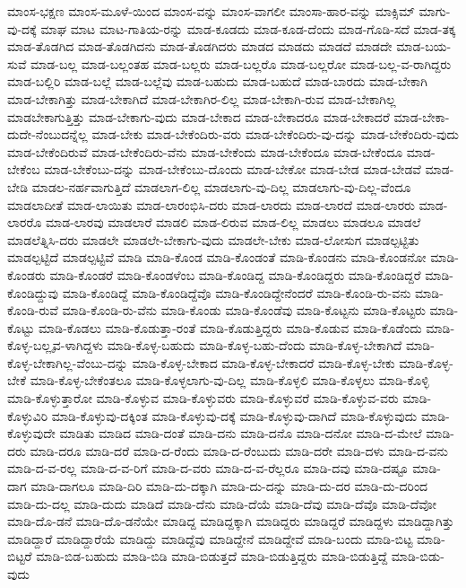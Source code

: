 {ಮಾಂಸ-ಭಕ್ಷಣ
ಮಾಂಸ-ಮೂಳೆ-ಯಿಂದ
ಮಾಂಸ-ವನ್ನು
ಮಾಂಸ-ವಾಗಲೀ
ಮಾಂಸಾ-ಹಾರ-ವನ್ನು
ಮಾಕ್ಸಿಮ್
ಮಾಗು-ವು-ದಕ್ಕೆ
ಮಾಘ
ಮಾಟ
ಮಾಟ-ಗಾತಿಯ-ರನ್ನು
ಮಾಡ-ಕೂಡದು
ಮಾಡ-ಕೂಡ-ದೆಂದು
ಮಾಡ-ಗೊಡಿ-ಸದೆ
ಮಾಡ-ತಕ್ಕ
ಮಾಡ-ತೊಡಗಿದ
ಮಾಡ-ತೊಡಗಿದನು
ಮಾಡ-ತೊಡಗಿದರು
ಮಾಡದ
ಮಾಡದು
ಮಾಡದೆ
ಮಾಡದೇ
ಮಾಡ-ಬಯ-ಸುವೆ
ಮಾಡ-ಬಲ್ಲ
ಮಾಡ-ಬಲ್ಲಂತಹ
ಮಾಡ-ಬಲ್ಲರು
ಮಾಡ-ಬಲ್ಲರೊ
ಮಾಡ-ಬಲ್ಲರೋ
ಮಾಡ-ಬಲ್ಲ-ವ-ರಾಗಿದ್ದರು
ಮಾಡ-ಬಲ್ಲಿರಿ
ಮಾಡ-ಬಲ್ಲೆ
ಮಾಡ-ಬಲ್ಲೆವು
ಮಾಡ-ಬಹುದು
ಮಾಡ-ಬಹುದೆ
ಮಾಡ-ಬಾರದು
ಮಾಡ-ಬೇಕಾಗಿ
ಮಾಡ-ಬೇಕಾಗಿತ್ತು
ಮಾಡ-ಬೇಕಾಗಿದೆ
ಮಾಡ-ಬೇಕಾಗಿರ-ಲಿಲ್ಲ
ಮಾಡ-ಬೇಕಾಗಿ-ರುವ
ಮಾಡ-ಬೇಕಾಗಿಲ್ಲ
ಮಾಡಬೇಕಾಗುತ್ತಿತ್ತು
ಮಾಡ-ಬೇಕಾಗು-ವುದು
ಮಾಡ-ಬೇಕಾದ
ಮಾಡ-ಬೇಕಾದರೂ
ಮಾಡ-ಬೇಕಾದರೆ
ಮಾಡ-ಬೇಕಾ-ದುದೇ-ನೆಂಬುದನ್ನೆಲ್ಲ
ಮಾಡ-ಬೇಕು
ಮಾಡ-ಬೇಕೆಂದಿರು-ವರು
ಮಾಡ-ಬೇಕೆಂದಿರು-ವು-ದನ್ನು
ಮಾಡ-ಬೇಕೆಂದಿರು-ವುದು
ಮಾಡ-ಬೇಕೆಂದಿರುವೆ
ಮಾಡ-ಬೇಕೆಂದಿರು-ವೆನು
ಮಾಡ-ಬೇಕೆಂದು
ಮಾಡ-ಬೇಕೆಂದೂ
ಮಾಡ-ಬೇಕೆಂದೂ
ಮಾಡ-ಬೇಕೆಂಬ
ಮಾಡ-ಬೇಕೆಂಬು-ದನ್ನು
ಮಾಡ-ಬೇಕೆಂಬು-ದೊಂದು
ಮಾಡ-ಬೇಕೋ
ಮಾಡ-ಬೇಡ
ಮಾಡ-ಬೇಡವೆ
ಮಾಡ-ಬೇಡಿ
ಮಾಡಲ-ನರ್ಹವಾಗುತ್ತಿದೆ
ಮಾಡಲಾಗ-ಲಿಲ್ಲ
ಮಾಡಲಾಗು-ವು-ದಿಲ್ಲ
ಮಾಡಲಾಗು-ವು-ದಿಲ್ಲ-ವೆಂದೂ
ಮಾಡಲಾದೀತೆ
ಮಾಡ-ಲಾಯಿತು
ಮಾಡ-ಲಾರಂಭಿಸಿ-ದರು
ಮಾಡ-ಲಾರದು
ಮಾಡ-ಲಾರದೆ
ಮಾಡ-ಲಾರರು
ಮಾಡ-ಲಾರರೊ
ಮಾಡ-ಲಾರವು
ಮಾಡಲಾರೆ
ಮಾಡಲಿ
ಮಾಡ-ಲಿರುವ
ಮಾಡ-ಲಿಲ್ಲ
ಮಾಡಲು
ಮಾಡಲೂ
ಮಾಡಲೆ
ಮಾಡಲೆತ್ನಿಸಿ-ದರು
ಮಾಡಲೇ
ಮಾಡಲೇ-ಬೇಕಾಗು-ವುದು
ಮಾಡಲೇ-ಬೇಕು
ಮಾಡ-ಲೋಸುಗ
ಮಾಡಲ್ಪಟ್ಟಿತು
ಮಾಡಲ್ಪಟ್ಟಿದೆ
ಮಾಡಲ್ಪಟ್ಟಿವೆ
ಮಾಡಿ
ಮಾಡಿ-ಕೊಂಡ
ಮಾಡಿ-ಕೊಂಡಂತೆ
ಮಾಡಿ-ಕೊಂಡನು
ಮಾಡಿ-ಕೊಂಡನೋ
ಮಾಡಿ-ಕೊಂಡರು
ಮಾಡಿ-ಕೊಂಡರೆ
ಮಾಡಿ-ಕೊಂಡಳೆಂಬ
ಮಾಡಿ-ಕೊಂಡಿದ್ದ
ಮಾಡಿ-ಕೊಂಡಿದ್ದರು
ಮಾಡಿ-ಕೊಂಡಿದ್ದರೆ
ಮಾಡಿ-ಕೊಂಡಿದ್ದುವು
ಮಾಡಿ-ಕೊಂಡಿದ್ದೆ
ಮಾಡಿ-ಕೊಂಡಿದ್ದೆವೊ
ಮಾಡಿ-ಕೊಂಡಿದ್ದೇನೆಂದರೆ
ಮಾಡಿ-ಕೊಂಡಿ-ರು-ವನು
ಮಾಡಿ-ಕೊಂಡಿ-ರುವೆ
ಮಾಡಿ-ಕೊಂಡಿ-ರು-ವೆನು
ಮಾಡಿ-ಕೊಂಡು
ಮಾಡಿ-ಕೊಂಡೆವು
ಮಾಡಿ-ಕೊಟ್ಟನು
ಮಾಡಿ-ಕೊಟ್ಟರು
ಮಾಡಿ-ಕೊಟ್ಟು
ಮಾಡಿ-ಕೊಡಲು
ಮಾಡಿ-ಕೊಡುತ್ತಾ-ರಂತೆ
ಮಾಡಿ-ಕೊಡುತ್ತಿದ್ದರು
ಮಾಡಿ-ಕೊಡುವ
ಮಾಡಿ-ಕೊಡೆಂದು
ಮಾಡಿ-ಕೊಳ್ಳ-ಬಲ್ಲೃವ-ಳಾಗಿದ್ದಳು
ಮಾಡಿ-ಕೊಳ್ಳ-ಬಹುದು
ಮಾಡಿ-ಕೊಳ್ಳ-ಬಹು-ದೆಂದು
ಮಾಡಿ-ಕೊಳ್ಳ-ಬೇಕಾಗಿದೆ
ಮಾಡಿ-ಕೊಳ್ಳ-ಬೇಕಾಗಿಲ್ಲ-ವೆಂಬು-ದನ್ನು
ಮಾಡಿ-ಕೊಳ್ಳ-ಬೇಕಾದ
ಮಾಡಿ-ಕೊಳ್ಳ-ಬೇಕಾದರೆ
ಮಾಡಿ-ಕೊಳ್ಳ-ಬೇಕು
ಮಾಡಿ-ಕೊಳ್ಳ-ಬೇಕೆ
ಮಾಡಿ-ಕೊಳ್ಳ-ಬೇಕೆಂತಲೂ
ಮಾಡಿ-ಕೊಳ್ಳಲಾಗು-ವು-ದಿಲ್ಲ
ಮಾಡಿ-ಕೊಳ್ಳಲಿ
ಮಾಡಿ-ಕೊಳ್ಳಲು
ಮಾಡಿ-ಕೊಳ್ಳಿ
ಮಾಡಿ-ಕೊಳ್ಳುತ್ತಾರೋ
ಮಾಡಿ-ಕೊಳ್ಳುವ
ಮಾಡಿ-ಕೊಳ್ಳುವರು
ಮಾಡಿ-ಕೊಳ್ಳುವರೆ
ಮಾಡಿ-ಕೊಳ್ಳುವ-ವರು
ಮಾಡಿ-ಕೊಳ್ಳುವಿರಿ
ಮಾಡಿ-ಕೊಳ್ಳುವು-ದಕ್ಕಿಂತ
ಮಾಡಿ-ಕೊಳ್ಳುವು-ದಕ್ಕೆ
ಮಾಡಿ-ಕೊಳ್ಳುವು-ದಾಗಿದೆ
ಮಾಡಿ-ಕೊಳ್ಳುವುದು
ಮಾಡಿ-ಕೊಳ್ಳುವುದೇ
ಮಾಡಿತು
ಮಾಡಿದ
ಮಾಡಿ-ದಂತೆ
ಮಾಡಿ-ದನು
ಮಾಡಿ-ದನೊ
ಮಾಡಿ-ದನೋ
ಮಾಡಿ-ದ-ಮೇಲೆ
ಮಾಡಿ-ದರು
ಮಾಡಿ-ದರೂ
ಮಾಡಿ-ದರೆ
ಮಾಡಿ-ದ-ರೆಂದು
ಮಾಡಿ-ದ-ರೆಂಬುದು
ಮಾಡಿ-ದರೇ
ಮಾಡಿ-ದಳು
ಮಾಡಿ-ದ-ವನು
ಮಾಡಿ-ದ-ವ-ರಲ್ಲ
ಮಾಡಿ-ದ-ವ-ರಿಗೆ
ಮಾಡಿ-ದ-ವರು
ಮಾಡಿ-ದ-ವ-ರೆಲ್ಲರೂ
ಮಾಡಿ-ದವು
ಮಾಡಿ-ದಷ್ಟೂ
ಮಾಡಿ-ದಾಗ
ಮಾಡಿ-ದಾಗಲೂ
ಮಾಡಿ-ದಿರಿ
ಮಾಡಿ-ದು-ದಕ್ಕಾಗಿ
ಮಾಡಿ-ದು-ದನ್ನು
ಮಾಡಿ-ದು-ದರ
ಮಾಡಿ-ದು-ದರಿಂದ
ಮಾಡಿ-ದು-ದಲ್ಲ
ಮಾಡಿ-ದುದು
ಮಾಡಿದೆ
ಮಾಡಿ-ದೆನು
ಮಾಡಿ-ದೆಯೆ
ಮಾಡಿ-ದೆವು
ಮಾಡಿ-ದೆವೊ
ಮಾಡಿ-ದೆವೋ
ಮಾಡಿ-ದೊ-ಡನೆ
ಮಾಡಿ-ದೊ-ಡನೆಯೇ
ಮಾಡಿದ್ದ
ಮಾಡಿದ್ದಕ್ಕಾಗಿ
ಮಾಡಿದ್ದರು
ಮಾಡಿದ್ದರೆ
ಮಾಡಿದ್ದಳು
ಮಾಡಿದ್ದಾಗಿತ್ತು
ಮಾಡಿದ್ದಾರೆ
ಮಾಡಿದ್ದಾರೆಯೆ
ಮಾಡಿದ್ದು
ಮಾಡಿದ್ದೆವು
ಮಾಡಿದ್ದೇನೆ
ಮಾಡಿದ್ದೇವೆ
ಮಾಡಿ-ಬಂದು
ಮಾಡಿ-ಬಿಟ್ಟ
ಮಾಡಿ-ಬಿಟ್ಟರೆ
ಮಾಡಿ-ಬಿಡ-ಬಹುದು
ಮಾಡಿ-ಬಿಡಿ
ಮಾಡಿ-ಬಿಡುತ್ತದೆ
ಮಾಡಿ-ಬಿಡುತ್ತಿದ್ದರು
ಮಾಡಿ-ಬಿಡುತ್ತಿದ್ದೆ
ಮಾಡಿ-ಬಿಡು-ವುದು
}
